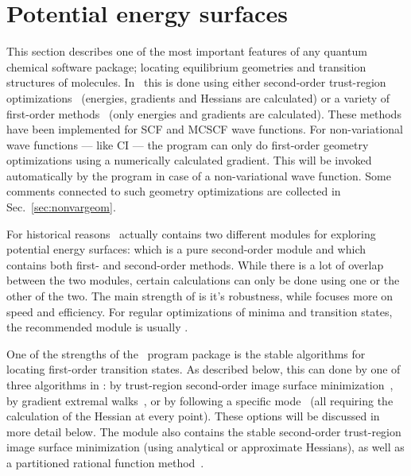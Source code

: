 \chapter{Potential energy surfaces}\label{ch:geometrywalks}

This section describes one of the most important features of any
quantum chemical software package; locating equilibrium
geometries and
transition structures of molecules. In
\dalton\ this is done using either
second-order trust-region 
optimizations~\cite{tuhjahjajpjjcp84} (energies, gradients and
Hessians are calculated) or a variety of first-order methods~\cite{Fletcher} (only energies and gradients are
calculated). These methods
have been implemented for SCF and MCSCF wave functions. For
non-variational wave functions --- like CI --- the program can
only do first-order geometry optimizations using a
numerically
calculated gradient. This will be invoked automatically by the program
in case of a non-variational wave function. Some comments connected to
such geometry optimizations are collected in Sec.~\ref{sec:nonvargeom}.

For historical reasons \dalton\ actually contains two different
modules for exploring potential energy surfaces:  which is
a pure second-order module and  which contains both
first- and second-order methods. While there is a lot of overlap
between the two modules, certain calculations can only be done using
one or the other of the two. The main strength of  is it's
robustness, while  focuses more on speed and
efficiency. For regular optimizations of minima and transition states,
the recommended module is usually .

One of the strengths of the \dalton\ program package is the
stable algorithms for locating first-order transition
states. As described below,
this can done by one of three algorithms in : by trust-region
second-order image surface minimization~\cite{thcpl182}, by gradient extremal
walks~\cite{pjhjajthtca73}, or by following a
specific mode~\cite{hjajpjthjcp85} (all
requiring the calculation of the Hessian at every point). These
options will be discussed in more detail below. The 
module also contains the stable second-order trust-region image
surface minimization (using analytical or approximate Hessians), as
well as a partitioned rational function method~\cite{abnajsrsjpc89}.

